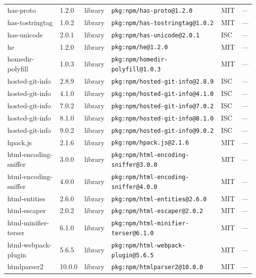\documentclass[11pt,a4paper]{article}
\begin{document}
\begin{longtable}{|p{4cm}|p{2cm}|p{1.6cm}|p{5cm}|p{1.5cm}|p{3.5cm}|}
\raggedright has-proto & 1.2.0 & library & \small\texttt{pkg:npm/has-proto@1.2.0} & MIT & \small — \\
\raggedright has-tostringtag & 1.0.2 & library & \small\texttt{pkg:npm/has-tostringtag@1.0.2} & MIT & \small — \\
\raggedright has-unicode & 2.0.1 & library & \small\texttt{pkg:npm/has-unicode@2.0.1} & ISC & \small — \\
\raggedright he & 1.2.0 & library & \small\texttt{pkg:npm/he@1.2.0} & MIT & \small — \\
\raggedright homedir-polyfill & 1.0.3 & library & \small\texttt{pkg:npm/homedir-polyfill@1.0.3} & MIT & \small — \\
\raggedright hosted-git-info & 2.8.9 & library & \small\texttt{pkg:npm/hosted-git-info@2.8.9} & ISC & \small — \\
\raggedright hosted-git-info & 4.1.0 & library & \small\texttt{pkg:npm/hosted-git-info@4.1.0} & ISC & \small — \\
\raggedright hosted-git-info & 7.0.2 & library & \small\texttt{pkg:npm/hosted-git-info@7.0.2} & ISC & \small — \\
\raggedright hosted-git-info & 8.1.0 & library & \small\texttt{pkg:npm/hosted-git-info@8.1.0} & ISC & \small — \\
\raggedright hosted-git-info & 9.0.2 & library & \small\texttt{pkg:npm/hosted-git-info@9.0.2} & ISC & \small — \\
\raggedright hpack.js & 2.1.6 & library & \small\texttt{pkg:npm/hpack.js@2.1.6} & MIT & \small — \\
\raggedright html-encoding-sniffer & 3.0.0 & library & \small\texttt{pkg:npm/html-encoding-sniffer@3.0.0} & MIT & \small — \\
\raggedright html-encoding-sniffer & 4.0.0 & library & \small\texttt{pkg:npm/html-encoding-sniffer@4.0.0} & MIT & \small — \\
\raggedright html-entities & 2.6.0 & library & \small\texttt{pkg:npm/html-entities@2.6.0} & MIT & \small — \\
\raggedright html-escaper & 2.0.2 & library & \small\texttt{pkg:npm/html-escaper@2.0.2} & MIT & \small — \\
\raggedright html-minifier-terser & 6.1.0 & library & \small\texttt{pkg:npm/html-minifier-terser@6.1.0} & MIT & \small — \\
\raggedright html-webpack-plugin & 5.6.5 & library & \small\texttt{pkg:npm/html-webpack-plugin@5.6.5} & MIT & \small — \\
\raggedright htmlparser2 & 10.0.0 & library & \small\texttt{pkg:npm/htmlparser2@10.0.0} & MIT & \small — \\

\end{longtable}
\end{document}
